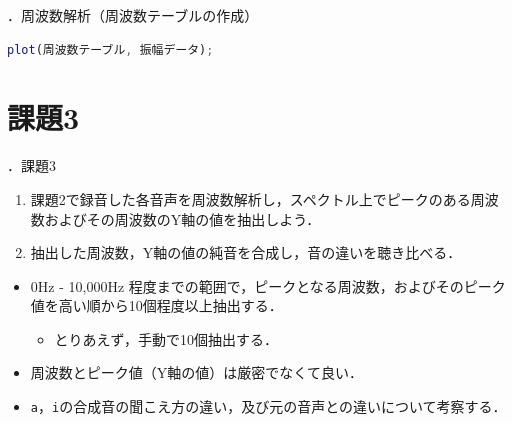 \documentclass[aspectratio=43]{beamer}
\newcommand{\showsec}{\thesection ．}
\begin{document}
\begin{frame}[t,containsverbatim]{\showsec 周波数解析（周波数テーブルの作成）}
    \begin{lstlisting}[language={Matlab},frame={lines},xleftmargin={0mm}]
plot(周波数テーブル, 振幅データ);
    \end{lstlisting}
    \begin{figure}
        \centering
    \end{figure}
\end{frame}
\section{課題3}
\begin{frame}[t]{\showsec 課題3}
    \begin{exampleblock}{}
        \begin{enumerate}
            \item 課題2で録音した各音声を周波数解析し，スペクトル上でピークのある周波数およびその周波数のY軸の値を抽出しよう．
            \item 抽出した周波数，Y軸の値の純音を合成し，音の違いを聴き比べる．
        \end{enumerate}
    \end{exampleblock}
    \dotfill
    \begin{itemize}
        \item 0Hz - 10,000Hz 程度までの範囲で，ピークとなる周波数，およびそのピーク値を高い順から10個程度以上抽出する．\\
              \begin{itemize}
                  \item とりあえず，手動で10個抽出する．
              \end{itemize}
        \item 周波数とピーク値（Y軸の値）は厳密でなくて良い．
        \item \texttt{a}，\texttt{i}の合成音の聞こえ方の違い，及び元の音声との違いについて考察する．
    \end{itemize}
\end{frame}
\end{document}
